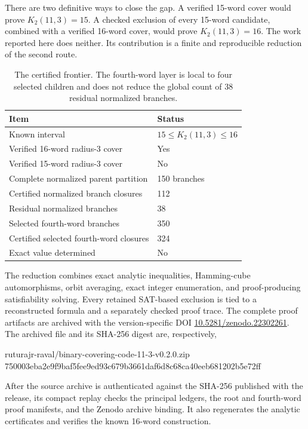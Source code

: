 \documentclass[11pt]{article}
\theoremstyle{definition}
\theoremstyle{remark}
\begin{document}
There are two definitive ways to close the gap.  A verified 15-word
cover would prove $K_2(11,3)=15$.  A checked exclusion of every
15-word candidate, combined with a verified 16-word cover, would prove
$K_2(11,3)=16$.  The work reported here does neither.  Its contribution
is a finite and reproducible reduction of the second route.

\begin{table}[ht]
\centering
\begin{tabular}{@{}ll@{}}
\toprule
Item & Status \\
\midrule
Known interval & $15\leq K_2(11,3)\leq16$ \\
Verified 16-word radius-3 cover & Yes \\
Verified 15-word radius-3 cover & No \\
Complete normalized parent partition & 150 branches \\
Certified normalized branch closures & 112 \\
Residual normalized branches & 38 \\
Selected fourth-word branches & 350 \\
Certified selected fourth-word closures & 324 \\
Exact value determined & No \\
\bottomrule
\end{tabular}
\caption{The certified frontier.  The fourth-word layer is local to
four selected children and does not reduce the global count of 38
residual normalized branches.}
\label{tab:frontier}
\end{table}

The reduction combines exact analytic inequalities, Hamming-cube
automorphisms, orbit averaging, exact integer enumeration, and
proof-producing satisfiability solving.  Every retained SAT-based
exclusion is tied to a reconstructed formula and a separately
checked proof trace.  The complete proof artifacts are archived with
the version-specific DOI
\href{https://doi.org/10.5281/zenodo.22302261}
{10.5281/zenodo.22302261}.  The archived file and its SHA-256 digest
are, respectively,
\begin{center}
\begin{minipage}{0.94\linewidth}
\small\ttfamily
ruturajr-raval/binary-covering-code-11-3-v0.2.0.zip\\
750003eba2e9f9baf5fee9ed93c679b3661daf6d8c68ca40eeb681202b5e72ff
\end{minipage}
\end{center}
After the source archive is authenticated against the SHA-256 published
with the release, its compact replay checks the principal ledgers, the
root and fourth-word proof manifests, and the Zenodo archive binding.
It also regenerates the analytic certificates and verifies the known
16-word construction.
\end{document}
